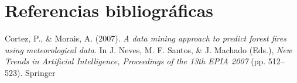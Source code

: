 \indent
\section{Referencias bibliográficas}
\leftskip 0.3in
\parindent -0.3in


Cortez, P., \& Morais, A. (2007). \textit{A data mining approach to predict forest
fires using meteorological data}. In J. Neves, M. F. Santos, \& J. Machado (Eds.),
\textit{New Trends in Artificial Intelligence, Proceedings of the 13th EPIA 2007}
(pp. 512--523). Springer